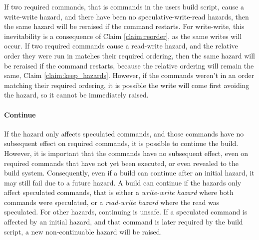 If two required commands, that is commands in the users build script, cause a write-write hazard, and there have been no speculative-write-read hazards, then the same hazard will be reraised if the command restarts. For write-write, this inevitability is a consequence of Claim \ref{claim:reorder}, as the same writes will occur.
%
If two required commands cause a read-write hazard, and the relative order they were run in matches their required ordering, then the same hazard will be reraised if the command restarts, because the relative ordering will remain the same, Claim \ref{claim:keep_hazards}. However, if the commands weren't in an order matching their required ordering, it is possible the write will come first avoiding the hazard, so it cannot be immediately raised.

\paragraph{Continue}
\label{sec:proof:continue}

If the hazard only affects speculated commands, and those commands have no subsequent effect on required commands, it is possible to continue the build. However, it is important that the commands have no subsequent effect, even on required commands that have not yet been executed, or even revealed to the build system. Consequently, even if a build can continue after an initial hazard, it may still fail due to a future hazard. A build can continue if the hazards only affect speculated commands, that is either
%
a \emph{write-write hazard} where both commands were speculated, or
a \emph{read-write hazard} where the read was speculated.
%
For other hazards, continuing is unsafe. If a speculated command is affected by an initial hazard, and that command is later required by the build script, a new non-continuable hazard will be raised.





